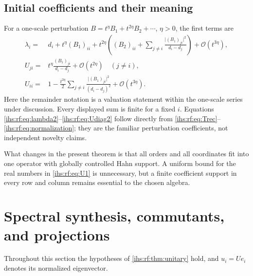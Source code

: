 \documentclass[11pt,a4paper]{article}
\numberwithin{equation}{section}
\theoremstyle{definition}
\theoremstyle{remark}
\newcommand{\bigo}{\mathcal O}
\newcommand{\abs}[1]{\lvert#1\rvert}
\begin{document}
\subsection{Initial coefficients and their meaning}\label{ihs:rf:sec:initial}

For a one-scale perturbation $B=t^\eta B_1+t^{2\eta}B_2+\cdots$, $\eta>0$,
the first terms are
\begin{align}
 \lambda_i={}&d_i+t^\eta(B_1)_{ii}
 +t^{2\eta}\left((B_2)_{ii}
 +\sum_{j\ne i}\frac{\abs{(B_1)_{ji}}^2}{d_i-d_j}\right)
 +\bigo(t^{3\eta}),\label{ihs:rf:eq:lambda2}\\
 U_{ji}={}&t^\eta\frac{(B_1)_{ji}}{d_i-d_j}
 +\bigo(t^{2\eta})\quad(j\ne i),\label{ihs:rf:eq:U1}\\
 U_{ii}={}&1-\frac{t^{2\eta}}2
 \sum_{j\ne i}\frac{\abs{(B_1)_{ji}}^2}{(d_i-d_j)^2}
 +\bigo(t^{3\eta}).\label{ihs:rf:eq:Udiag2}
\end{align}
Here the remainder notation is a valuation statement within the one-scale
series under discussion. Every displayed sum is finite for a fixed $i$.
Equations
\eqref{ihs:rf:eq:lambda2}--\eqref{ihs:rf:eq:Udiag2} follow directly from
\eqref{ihs:rf:eq:Trec}--\eqref{ihs:rf:eq:normalization}; they are the
familiar perturbation coefficients, not independent novelty claims.

What changes in the present theorem is that all orders and all coordinates
fit into one operator with globally controlled Hahn support. A uniform bound
for the real numbers in \eqref{ihs:rf:eq:U1} is unnecessary, but a finite
coefficient support in every row and column remains essential to the chosen
algebra.

\section{Spectral synthesis, commutants, and projections}\label{ihs:sec:synthesis}

Throughout this section the hypotheses of \cref{ihs:rf:thm:unitary} hold,
and $u_i=Ue_i$ denotes its normalized eigenvector.
\end{document}
